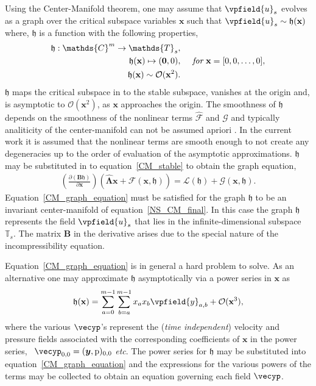 Using the Center-Manifold theorem, one may assume that $\vpfield{u}_{s}$ evolves as a graph over the critical subspace variables $\mathbf{x}$ such that $\vpfield{u}_{s} \sim \mathfrak{h}(\mathbf{x})$ where, $\mathfrak{h}$ is a function with the following properties,
\begin{eqnarray}
	\label{CM_approx_properties}
	\mathfrak{h}: \mathds{C}^{m} \to \mathds{T}_{s}, & \nonumber \\
	\mathfrak{h}(\mathbf{x}) \mapsto (\boldsymbol{0},\pfield{0}), & \hspace{5mm} \textit{for}\ \mathbf{x} = [0,0,\ldots,0] , \nonumber \\
	\mathfrak{h}(\mathbf{x}) \sim \mathcal{O}(\mathbf{x}^{2}). & \nonumber
\end{eqnarray}
\ie $\mathfrak{h}$ maps the critical subspace in to the stable subspace, vanishes at the origin and, is asymptotic to $\mathcal{O}(\mathbf{x}^{2})$, as $\mathbf{x}$ approaches the origin. 
The smoothness of $\mathfrak{h}$ depends on the smoothness of the nonlinear terms $\mathcal{\widehat{F}}$ and $\mathcal{G}$ and typically analiticity of the center-manifold can not be assumed apriori \citep{carr82,sijbrand85}. In the current work it is assumed that the nonlinear terms are smooth enough to not create any degeneracies up to the order of evaluation of the asymptotic approximations. $\mathfrak{h}$ may be substituted in to equation~\eqref{CM_stable} to obtain the graph equation,
\begin{eqnarray}
	\label{CM_graph_equation}
	\left(\frac{\partial (\mathbf{B}\mathfrak{h})}{\partial \mathbf{x}}\right)\left(\mathbf{\widehat{\Lambda}}\mathbf{x} + \mathcal{\widehat{F}}(\mathbf{x},\mathfrak{h}) \right) = \mathcal{L}(\mathfrak{h}) + \mathcal{G}(\mathbf{x},\mathfrak{h}).
\end{eqnarray}
Equation~\eqref{CM_graph_equation} must be satisfied for the graph $\mathfrak{h}$ to be an invariant center-manifold of equation~\eqref{NS_CM_final}. In this case the graph $\mathfrak{h}$ represents the field $\vpfield{u}_{s}$ that lies in the infinite-dimensional subspace $\mathds{T}_{s}$. The matrix $\mathbf{B}$ in the derivative arises due to the special nature of the incompressibility equation.

Equation~\eqref{CM_graph_equation} is in general a hard problem to solve. As an alternative one may approximate $\mathfrak{h}$ asymptotically via a power series in $\mathbf{x}$ as
\begin{alignat}{4}
	\label{CM_H_approx}
		\mathfrak{h}(\mathbf{x}) = \sum_{a=0}^{m-1}\sum_{b=a}^{m-1} x_{a}x_{b}\vpfield{y}_{a,b} + %
		 \mathcal{O}(\mathbf{x}^{3}),
\end{alignat}
where the various $\vecyp$'s represent the (\emph{time independent}) velocity and pressure fields associated with the corresponding coefficients of $\mathbf{x}$ in the power series, \ie\ $\vecyp_{0,0} = (\vfield{y},\pfield{p})_{0,0}$ \textit{etc}. The power series for $\mathfrak{h}$ may be substituted into equation~\eqref{CM_graph_equation} and the expressions for the various powers of the terms may be collected to obtain an equation governing each field $\vecyp$.

